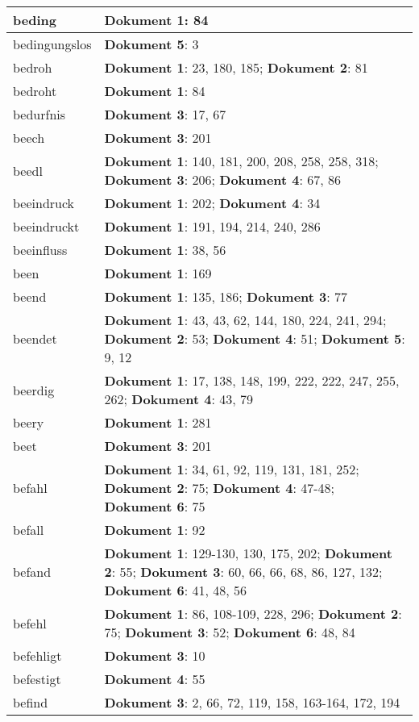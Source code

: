 \documentclass[a5paper]{article}
\begin{document}
\begin{longtable}[l]{|l|p{3in}|}
\hline
beding & \textbf{Dokument 1}: 84 \\
\hline
bedingungslos & \textbf{Dokument 5}: 3 \\
\hline
bedroh & \textbf{Dokument 1}: 23, 180, 185; \textbf{Dokument 2}: 81 \\
\hline
bedroht & \textbf{Dokument 1}: 84 \\
\hline
bedurfnis & \textbf{Dokument 3}: 17, 67 \\
\hline
beech & \textbf{Dokument 3}: 201 \\
\hline
beedl & \textbf{Dokument 1}: 140, 181, 200, 208, 258, 258, 318; \textbf{Dokument 3}: 206; \textbf{Dokument 4}: 67, 86 \\
\hline
beeindruck & \textbf{Dokument 1}: 202; \textbf{Dokument 4}: 34 \\
\hline
beeindruckt & \textbf{Dokument 1}: 191, 194, 214, 240, 286 \\
\hline
beeinfluss & \textbf{Dokument 1}: 38, 56 \\
\hline
been & \textbf{Dokument 1}: 169 \\
\hline
beend & \textbf{Dokument 1}: 135, 186; \textbf{Dokument 3}: 77 \\
\hline
beendet & \textbf{Dokument 1}: 43, 43, 62, 144, 180, 224, 241, 294; \textbf{Dokument 2}: 53; \textbf{Dokument 4}: 51; \textbf{Dokument 5}: 9, 12 \\
\hline
beerdig & \textbf{Dokument 1}: 17, 138, 148, 199, 222, 222, 247, 255, 262; \textbf{Dokument 4}: 43, 79 \\
\hline
beery & \textbf{Dokument 1}: 281 \\
\hline
beet & \textbf{Dokument 3}: 201 \\
\hline
befahl & \textbf{Dokument 1}: 34, 61, 92, 119, 131, 181, 252; \textbf{Dokument 2}: 75; \textbf{Dokument 4}: 47-48; \textbf{Dokument 6}: 75 \\
\hline
befall & \textbf{Dokument 1}: 92 \\
\hline
befand & \textbf{Dokument 1}: 129-130, 130, 175, 202; \textbf{Dokument 2}: 55; \textbf{Dokument 3}: 60, 66, 66, 68, 86, 127, 132; \textbf{Dokument 6}: 41, 48, 56 \\
\hline
befehl & \textbf{Dokument 1}: 86, 108-109, 228, 296; \textbf{Dokument 2}: 75; \textbf{Dokument 3}: 52; \textbf{Dokument 6}: 48, 84 \\
\hline
befehligt & \textbf{Dokument 3}: 10 \\
\hline
befestigt & \textbf{Dokument 4}: 55 \\
\hline
befind & \textbf{Dokument 3}: 2, 66, 72, 119, 158, 163-164, 172, 194 \\

\end{longtable}
\end{document}
